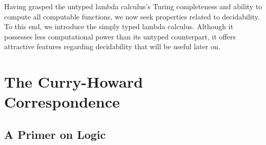 \documentclass[12pt]{book}
\begin{document}
Having grasped the untyped lambda calculus's Turing completeness and ability to compute all computable functions, we now seek properties related to decidability. To this end, we introduce the simply typed lambda calculus. Although it possesses less computational power than its untyped counterpart, it offers attractive features regarding decidability that will be useful later on.
\chapter{The Curry-Howard Correspondence}
\section*{\centering A Primer on Logic}
\end{document}
